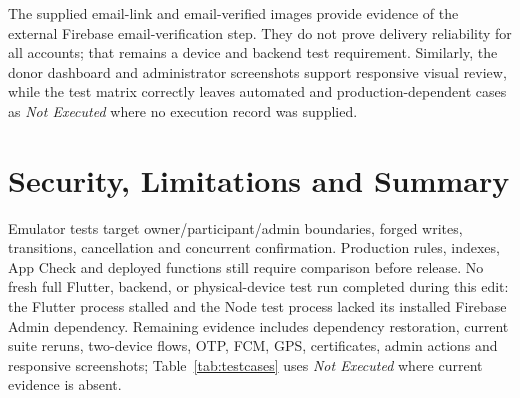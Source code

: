 The supplied email-link and email-verified images provide evidence of the external Firebase email-verification step. They do not prove delivery reliability for all accounts; that remains a device and backend test requirement. Similarly, the donor dashboard and administrator screenshots support responsive visual review, while the test matrix correctly leaves automated and production-dependent cases as 
\textit{Not Executed} where no execution record was supplied.
\section{Security, Limitations and Summary}
Emulator tests target owner/participant/admin boundaries, forged writes, transitions, cancellation and concurrent confirmation. Production rules, indexes, App Check and deployed functions still require comparison before release. No fresh full Flutter, backend, or physical-device test run completed during this edit: the Flutter process stalled and the Node test process lacked its installed Firebase Admin dependency. Remaining evidence includes dependency restoration, current suite reruns, two-device flows, OTP, FCM, GPS, certificates, admin actions and responsive screenshots; Table~\ref{tab:testcases} uses \textit{Not Executed} where current evidence is absent.
